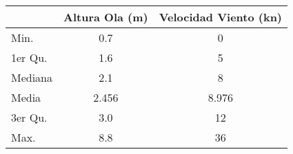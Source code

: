 \begin{tabular}{lS[table-format=1.3]S[table-format=2.3]}
    \toprule
    & {Altura Ola (\si{\meter})} & {Velocidad Viento (\si{\knot})} \\
    \midrule
 Min.    &0.7   &  0   \\ 
 1er Qu. &1.6   &  5   \\ 
 Mediana &2.1   &  8   \\ 
 Media   &2.456   &  8.976   \\ 
 3er Qu. &3.0   & 12   \\ 
 Max.    &8.8   & 36   \\ 
    \bottomrule
\end{tabular}
